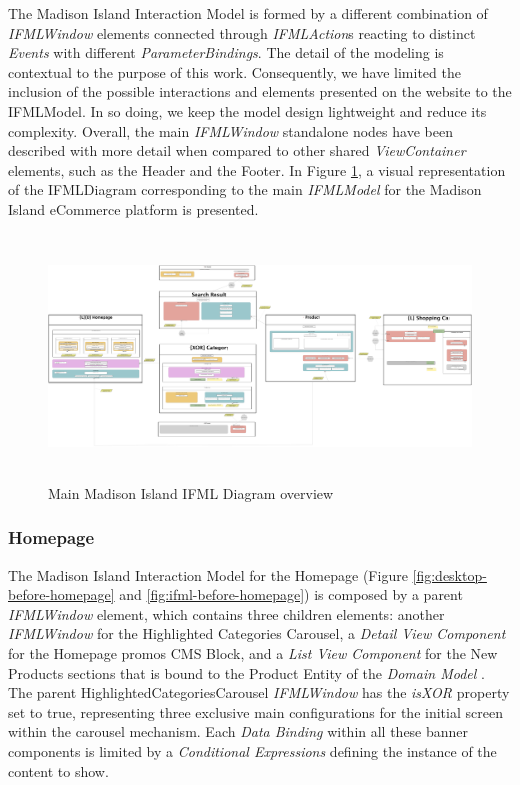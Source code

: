 The Madison Island Interaction Model is formed by a different combination of \textit{IFMLWindow} elements connected through \textit{IFMLAction}s reacting to distinct \textit{Events} with different \textit{ParameterBindings}. The detail of the modeling is contextual to the purpose of this work. Consequently, we have limited the inclusion of the possible interactions and elements presented on the website to the IFMLModel. In so doing, we keep the model design lightweight and reduce its complexity. Overall, the main \textit{IFMLWindow} standalone nodes have been described with more detail when compared to other shared \textit{ViewContainer} elements, such as the Header and the Footer. In Figure \ref{fig:ifml-before-global}, a visual representation of the IFMLDiagram corresponding to the main \textit{IFMLModel} for the Madison Island eCommerce platform is presented.

\vspace{0.5cm}
\begin{figure}[H]
  \centering
    \includegraphics[height=6.5cm] {images/diagrams/before/ifml-global.png}
  \caption{Main Madison Island IFML Diagram overview}
  \label{fig:ifml-before-global}
\end{figure}
\vspace{0.5cm}
\newpage
\subsubsection{Homepage}

The Madison Island Interaction Model for the Homepage (Figure \ref{fig:desktop-before-homepage} and \ref{fig:ifml-before-homepage}) is composed by a parent \textit{IFMLWindow} element, which contains three children elements: another \textit{IFMLWindow} for the Highlighted Categories Carousel, a \textit{Detail View Component} for the Homepage promos CMS Block, and a \textit{List View Component} for the New Products sections that is bound to the Product Entity of the \textit{Domain Model} . The parent HighlightedCategoriesCarousel \textit{IFMLWindow} has the \textit{isXOR} property set to true, representing three exclusive main configurations for the initial screen within the carousel mechanism. Each \textit{Data Binding} within all these banner components is limited by a \textit{Conditional Expressions} defining the instance of the content to show.

